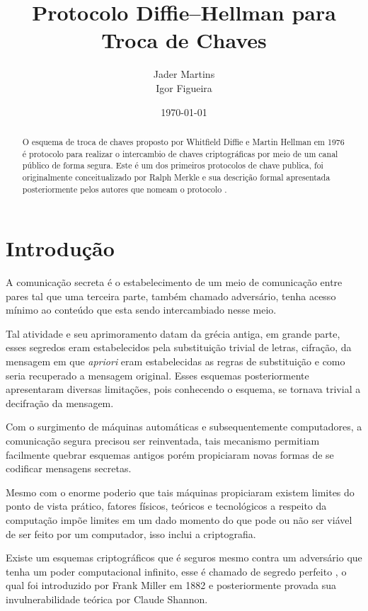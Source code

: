 \documentclass{article}
\title{Protocolo Diffie–Hellman para Troca de Chaves}
\author{Jader Martins\\
        Igor Figueira}
\date{\today}
\begin{document}
\maketitle

\begin{abstract}
    O esquema de troca de chaves proposto por Whitfield Diffie e
    Martin Hellman em 1976 é protocolo para realizar
    o intercambio de chaves criptográficas por meio de um canal público
    de forma segura\cite{Diffie}. Este é um dos primeiros protocolos de
    chave publica, foi originalmente conceitualizado por Ralph Merkle
    e sua descrição formal apresentada posteriormente pelos autores que
    nomeam o protocolo \cite{Merkle}.
\end{abstract}

\section{Introdução}%
\label{sec:introducao}
A comunicação secreta é o estabelecimento de um meio de comunicação entre pares
tal que uma terceira parte, também chamado adversário, tenha acesso mínimo ao
conteúdo que esta sendo intercambiado nesse meio.

Tal atividade e seu aprimoramento datam da grécia
antiga\cite{katz2014introduction}, em grande parte, esses segredos eram
estabelecidos pela substituição trivial de letras, cifração, da mensagem em que
\textit{apriori} eram estabelecidas as regras de substituição e como seria recuperado a
mensagem original. Esses esquemas posteriormente apresentaram diversas
limitações, pois conhecendo o esquema, se tornava trivial a decifração da
mensagem.

Com o surgimento de máquinas automáticas e subsequentemente computadores, a
comunicação segura precisou ser reinventada\cite{singh1999code}, tais mecanismo
permitiam facilmente quebrar esquemas antigos porém propiciaram novas formas de
se codificar mensagens secretas\cite{Diffie}.

Mesmo com o enorme poderio que tais máquinas propiciaram existem limites do ponto
de vista prático, fatores físicos, teóricos e tecnológicos a respeito da computação
impõe limites em um dado momento do que pode ou não ser viável de ser feito por
um computador, isso inclui a criptografia.

Existe um esquemas criptográficos que é seguros mesmo contra um adversário que tenha
um poder computacional infinito, esse é chamado de segredo perfeito
\cite{katz2014introduction}, o qual foi introduzido por Frank Miller em
1882\cite{frankm} e posteriormente provada sua invulnerabilidade teórica
por Claude Shannon\cite{shannon1949communication}.
\end{document}
